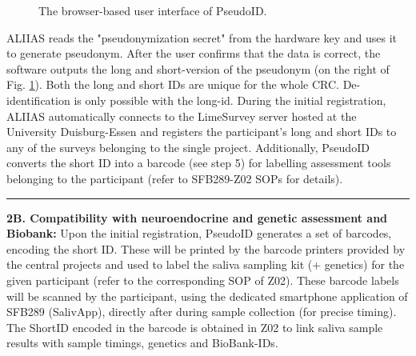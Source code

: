 \begin{figure}
{}
\hfill
{}
\caption{The browser-based user interface of PseudoID.}
\label{fig:screenshots}
\end{figure}

ALIIAS reads the "pseudonymization secret" from the hardware key and uses it to generate pseudonym. After the user confirms that the data is correct, the software outputs the long and short-version of the pseudonym (on the right of Fig. \ref{fig:screenshots}). Both the long and short IDs are unique for the whole CRC. De-identification is only possible with the long-id. During the initial registration, ALIIAS automatically connects to the LimeSurvey server hosted at the University Duisburg-Essen and registers the participant's long and short IDs to any of the surveys belonging to the single project. Additionally, PseudoID converts the short ID into a barcode (see step 5) for labelling assessment tools belonging to the participant (refer to SFB289-Z02 SOPs for details).

\par\noindent\rule{\textwidth\color{pniblue}}{0.4pt} 
\textbf{2B. Compatibility with neuroendocrine and genetic assessment and Biobank:} Upon the initial registration, PseudoID generates a set of barcodes, encoding the short ID. These will be printed by the barcode printers provided by the central projects and used to label the saliva sampling kit (+ genetics) for the given participant (refer to the corresponding SOP of Z02). These barcode labels will be scanned by the participant, using the dedicated smartphone application of SFB289 (SalivApp), directly after during sample collection (for precise timing). The ShortID encoded in the barcode is obtained in Z02 to link saliva sample results with sample timings, genetics and BioBank-IDs.

